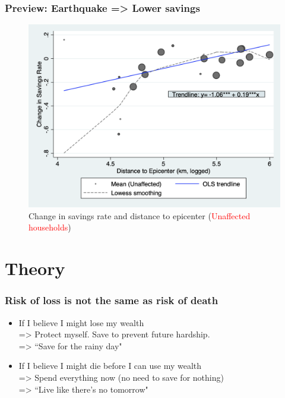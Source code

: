 \documentclass[aspectratio=169]{beamer}
\begin{document}
\begin{frame}
	\frametitle{\Large{Preview: Earthquake => Lower savings}}
	\begin{figure}
	    \caption{\small{Change in savings rate and distance to epicenter (\textcolor{red}{Unaffected households})}}
	    \includegraphics[scale=0.35]{pics/incomecons_plot_RAR2draft} 
	\end{figure}
\end{frame}


\section{Theory}
\begin{frame}
    \frametitle{\Large{Risk of loss is not the same as risk of death}}
    \begin{itemize}
        \item If I believe I might lose my wealth \\
            => Protect myself. Save to prevent future hardship. \\ 
            => ``Save for the rainy day"
        \item If I believe I might die before I can use my wealth \\ 
            => Spend everything now (no need to save for nothing) \\ 
            => ``Live like there's no tomorrow"
    \end{itemize}
\end{frame} 
	
\end{document}
